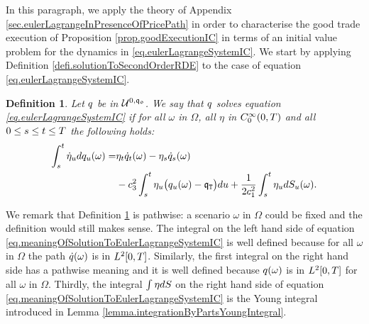 \documentclass[10pt,a4paper]{article}
\newtheorem{defi}[thm]{Definition}
\begin{document}
	In this  paragraph, we apply the theory of Appendix \ref{sec.eulerLagrangeInPresenceOfPricePath} in order to characterise the good trade execution of Proposition \ref{prop.goodExecutionIC} in terms of an initial value problem for the dynamics in \eqref{eq.eulerLagrangeSystemIC}. We start by applying Definition \ref{defi.solutionToSecondOrderRDE} to the case of equation \eqref{eq.eulerLagrangeSystemIC}.
	\begin{defi}\label{defi.meaningOfSolutionToEulerLagrangeSystemIC}
		Let $q$ be in $\mathcal{U}^{0,\mathfrak{q_0}}$. We say that $q$ solves equation \eqref{eq.eulerLagrangeSystemIC} if for all $\omega$ in $\Omega$, all $\eta$ in $C^{\infty}_{0} (0,T)$ and all $0\leq s\leq t \leq T$ the following holds:
		\begin{equation}
		\label{eq.meaningOfSolutionToEulerLagrangeSystemIC}
		\begin{split}
		\int_{s}^{t} \dot{\eta}_u dq_u (\omega) 
		=& \eta_t \dot{q}_{t}(\omega) - \eta_s \dot{q}_s (\omega) \\
		& - c_{3}^{2} 	\int_{s}^{t} \eta_u \big(q_u (\omega) - \mathfrak{q}_{\mathtt{T} }\big) du 
		+ \frac{1}{2c_{1}^{2}} 	\int_{s}^{t} \eta_{u} dS_u (\omega).
		\end{split}
		\end{equation}
	\end{defi}
	We remark that Definition \ref{defi.meaningOfSolutionToEulerLagrangeSystemIC} is pathwise: a scenario $\omega$ in $\Omega$ could be fixed and the definition would still makes sense. The integral on the left hand side of equation \eqref{eq.meaningOfSolutionToEulerLagrangeSystemIC} is well defined because for all $\omega$ in $\Omega$ the path $\dot{q}(\omega)$ is in $L^{2} {[0,T]}$. Similarly, the first integral on the right hand side has a pathwise meaning and it is well defined because $q(\omega)$ is in $L^{2} {[0,T]}$ for all  $\omega$ in $\Omega$. Thirdly, the integral $\int \eta dS$ on the right hand side of equation \eqref{eq.meaningOfSolutionToEulerLagrangeSystemIC} is the Young integral introduced in Lemma \ref{lemma.integrationByPartsYoungIntegral}.
	
\end{document}
